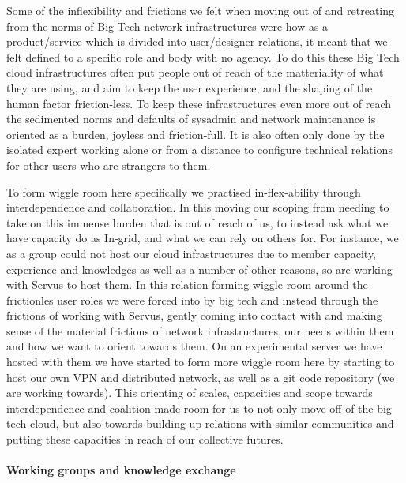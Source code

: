 Some of the inflexibility and frictions we felt when moving out of and
retreating from the norms of Big Tech network infrastructures were how
as a product/service which is divided into user/designer relations, it
meant that we felt defined to a specific role and body with no agency.
To do this these Big Tech cloud infrastructures often put people out of
reach of the matteriality of what they are using, and aim to keep the
user experience, and the shaping of the human factor friction-less. To
keep these infrastructures even more out of reach the sedimented norms
and defaults of sysadmin and network maintenance is oriented as a
burden, joyless and friction-full. It is also often only done by the
isolated expert working alone or from a distance to configure technical
relations for other users who are strangers to them.

To form wiggle room here specifically we practised in-flex-ability
through interdependence and collaboration. In this moving our scoping
from needing to take on this immense burden that is out of reach of us,
to instead ask what we have capacity do as In-grid, and what we can rely
on others for. For instance, we as a group could not host our cloud
infrastructures due to member capacity, experience and knowledges as
well as a number of other reasons, so are working with Servus to host
them. In this relation forming wiggle room around the frictionles user
roles we were forced into by big tech and instead through the frictions
of working with Servus, gently coming into contact with and making sense
of the material frictions of network infrastructures, our needs within
them and how we want to orient towards them. On an experimental server
we have hosted with them we have started to form more wiggle room here
by starting to host our own VPN and distributed network, as well as a
git code repository (we are working towards). This orienting of scales,
capacities and scope towards interdependence and coalition made room for
us to not only move off of the big tech cloud, but also towards building
up relations with similar communities and putting these capacities in
reach of our collective futures.

\hypertarget{working-groups-and-knowledge-exchange}{%
\paragraph[Working groups and knowledge
exchange]{\texorpdfstring{\protect\hypertarget{anchor}{}{}Working groups
and knowledge
exchange}{Working groups and knowledge exchange}}\label{working-groups-and-knowledge-exchange}}

